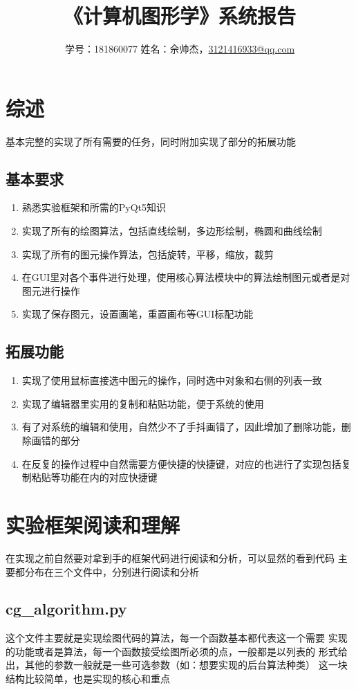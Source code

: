 \documentclass[a4paper,UTF8]{article}
\theoremstyle{definition}
\begin{document}
\title{\textbf{《计算机图形学》系统报告}}
\author{学号：181860077 姓名：佘帅杰，\href{mailto:3121416933@qq.com}{3121416933@qq.com}}
\maketitle

\section{综述}
基本完整的实现了所有需要的任务，同时附加实现了部分的拓展功能
\subsection{基本要求}
\begin{enumerate}
    \item 熟悉实验框架和所需的PyQt5知识
    \item 实现了所有的绘图算法，包括直线绘制，多边形绘制，椭圆和曲线绘制
    \item 实现了所有的图元操作算法，包括旋转，平移，缩放，裁剪
    \item 在GUI里对各个事件进行处理，使用核心算法模块中的算法绘制图元或者是对图元进行操作
    \item 实现了保存图元，设置画笔，重置画布等GUI标配功能
\end{enumerate}
\subsection{拓展功能}
\begin{enumerate}
    \item 实现了使用鼠标直接选中图元的操作，同时选中对象和右侧的列表一致
    \item 实现了编辑器里实用的复制和粘贴功能，便于系统的使用
    \item 有了对系统的编辑和使用，自然少不了手抖画错了，因此增加了删除功能，删除画错的部分
    \item 在反复的操作过程中自然需要方便快捷的快捷键，对应的也进行了实现包括复制粘贴等功能在内的对应快捷键
\end{enumerate}

\section{实验框架阅读和理解}
在实现之前自然要对拿到手的框架代码进行阅读和分析，可以显然的看到代码
主要都分布在三个文件中，分别进行阅读和分析
\subsection{cg\_algorithm.py}
这个文件主要就是实现绘图代码的算法，每一个函数基本都代表这一个需要
实现的功能或者是算法，每一个函数接受绘图所必须的点，一般都是以列表的
形式给出，其他的参数一般就是一些可选参数（如：想要实现的后台算法种类）
这一块结构比较简单，也是实现的核心和重点
\end{document}
